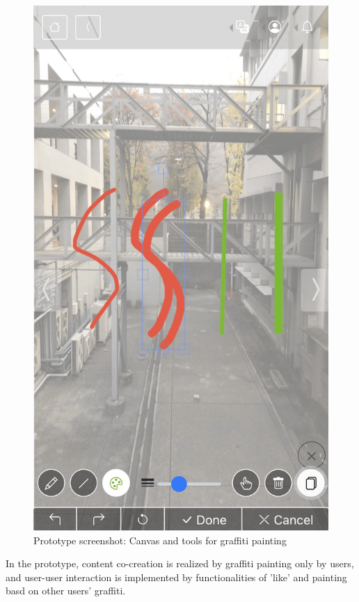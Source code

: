 \begin{figure}
\begin{minipage}{0.48\textwidth}
    \includegraphics[width=0.9\linewidth]{resources/4_methodology/prototype_canvas.png}
      \caption{Prototype screenshot: Canvas and tools for graffiti painting}
  \end{minipage}
\end{figure}

In the prototype, content co-creation is realized by graffiti painting only by users,
and user-user interaction is implemented by functionalities of 'like' and painting basd on other users' graffiti.
